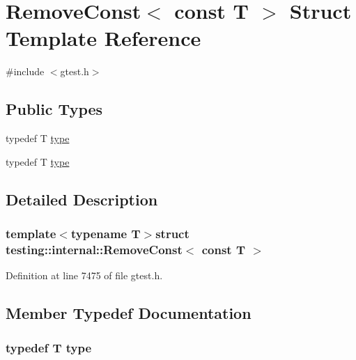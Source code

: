\hypertarget{structtesting_1_1internal_1_1RemoveConst_3_01const_01T_01_4}{\section{\-Remove\-Const$<$ const \-T $>$ \-Struct \-Template \-Reference}
\label{d4/de8/structtesting_1_1internal_1_1RemoveConst_3_01const_01T_01_4}
}


{\ttfamily \#include $<$gtest.\-h$>$}

\subsection*{\-Public \-Types}
\begin{DoxyCompactItemize}
\item 
typedef \-T \hyperlink{structtesting_1_1internal_1_1RemoveConst_3_01const_01T_01_4_a565429e62c1d4fd084335146ba778e17}{type}
\item 
typedef \-T \hyperlink{structtesting_1_1internal_1_1RemoveConst_3_01const_01T_01_4_a565429e62c1d4fd084335146ba778e17}{type}
\end{DoxyCompactItemize}


\subsection{\-Detailed \-Description}
\subsubsection*{template$<$typename T$>$struct testing\-::internal\-::\-Remove\-Const$<$ const T $>$}



\-Definition at line 7475 of file gtest.\-h.



\subsection{\-Member \-Typedef \-Documentation}
\hypertarget{structtesting_1_1internal_1_1RemoveConst_3_01const_01T_01_4_a565429e62c1d4fd084335146ba778e17}{
\subsubsection[{type}]{\setlength{\rightskip}{0pt plus 5cm}typedef \-T {\bf type}}}\label{d4/de8/structtesting_1_1internal_1_1RemoveConst_3_01const_01T_01_4_a565429e62c1d4fd084335146ba778e17}



